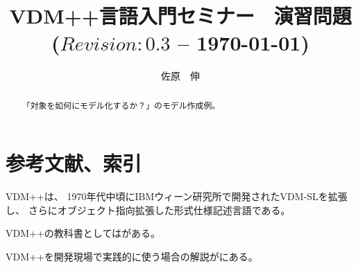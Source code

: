 \documentclass[a4paper,10pt]{jsarticle}
\begin{document}

\title{VDM++言語入門セミナー　演習問題\\
\small{($Revision: 0.3 $ -- \today)}}
\author{佐原　伸\\
}
\date{\mbox{}}
\maketitle

\begin{abstract}
\setlength{\baselineskip}{12pt plus .1pt}
「対象を如何にモデル化するか？」のモデル作成例。
\end{abstract}

\tableofcontents





%
%

%
%
%

\newpage

\section{参考文献、索引}
VDM++\cite{Kyushu2016PP}は、
1970年代中頃にIBMウィーン研究所で開発されたVDM-SL\cite{Kyushu2016SL}を拡張し、
さらにオブジェクト指向拡張した形式仕様記述言語である。


VDM++の教科書としては\cite{Sakoh2010}がある。

VDM++を開発現場で実践的に使う場合の解説が\cite{Sahara2008}にある。


%

%


\printindex
\end{document}
